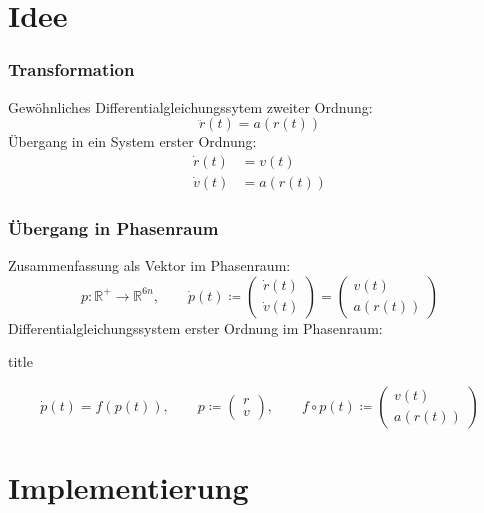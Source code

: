 \documentclass[aspectratio=169]{beamer}
\newcommand{\function}[3]{#1\colon#2\to#3}
\newcommand{\setReal}{\mathds{R}}
\newcommand{\separate}{,\qquad}
\newcommand{\define}{\coloneqq}
\newenvironment{mybox}{
  \begin{beamercolorbox}[sep=0pt,center,shadow=true,rounded=true]{title}
}{
  \end{beamercolorbox}
}
\begin{document}
  \section{Idee}
    \begin{frame}
      \frametitle{Transformation}
      Gewöhnliches Differentialgleichungssytem zweiter Ordnung:
      \[
        \ddot{r}(t) = a(r(t))
      \]
      Übergang in ein System erster Ordnung:
      \begin{align*}
        \dot{r}(t) &= v(t) \\
        \dot{v}(t) &= a(r(t))
      \end{align*}
    \end{frame}
    \begin{frame}
      \frametitle{Übergang in Phasenraum}
      Zusammenfassung als Vektor im Phasenraum:
      \[
        \function{p}{\setReal^{+}}{\setReal^{6n}}
        \separate
        \dot{p}(t)\define
        \begin{pmatrix}
          \dot{r}(t) \\ \dot{v}(t)
        \end{pmatrix}
        =
        \begin{pmatrix}
          v(t) \\ a(r(t))
        \end{pmatrix}
      \]
      Differentialgleichungssystem erster Ordnung im Phasenraum:
      \begin{mybox}
        \[
          \dot{p}(t) = f(p(t))
          \separate
          p \define
          \begin{pmatrix}
            r \\ v
          \end{pmatrix}
          \separate
          f\circ p(t) \define
          \begin{pmatrix}
            v(t) \\ a(r(t))
          \end{pmatrix}
        \]
      \end{mybox}
    \end{frame}

  \section{Implementierung}
\end{document}
